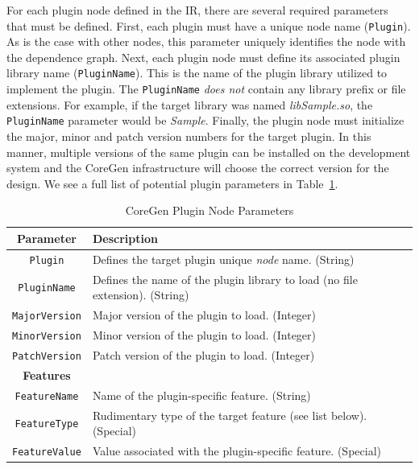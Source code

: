 \documentclass{article}
\begin{document}
For each plugin node defined in the IR, there are several required parameters that must be defined.  First, 
each plugin must have a unique node name (\texttt{Plugin}).  As is the case with other nodes, this parameter 
uniquely identifies the node with the dependence graph.  Next, each plugin node must define its associated 
plugin library name (\texttt{PluginName}).  This is the name of the plugin library utilized to implement the plugin.  
The \texttt{PluginName} \textit{does not} contain any library prefix or file extensions.  For example, if the target 
library was named \textit{libSample.so}, the \texttt{PluginName} parameter would be \textit{Sample}.  Finally, 
the plugin node must initialize the major, minor and patch version numbers for the target plugin.  In this manner, 
multiple versions of the same plugin can be installed on the development system and the CoreGen infrastructure 
will choose the correct version for the design.  We see a full list of potential plugin parameters in Table~\ref{tab:PluginParams}.    

\begin{table}[h]
\begin{center}
\caption{CoreGen Plugin Node Parameters}
\vspace{0.125in}
\label{tab:PluginParams}
\begin{tabular}{|c|l|}
\hline
\textbf{Parameter} & \textbf{Description}\\
\hline
\texttt{Plugin} & Defines the target plugin unique \textit{node} name. (String)\\
\hline
\texttt{PluginName} & Defines the name of the plugin library to load (no file extension). (String)\\
\hline
\texttt{MajorVersion} & Major version of the plugin to load. (Integer)\\
\hline
\texttt{MinorVersion} & Minor version of the plugin to load. (Integer)\\
\hline
\texttt{PatchVersion} & Patch version of the plugin to load. (Integer)\\
\hline
\textbf{Features} & \\
\hline
\texttt{FeatureName} & Name of the plugin-specific feature. (String)\\
\hline
\texttt{FeatureType} & Rudimentary type of the target feature (see list below). (Special)\\
\hline
\texttt{FeatureValue} & Value associated with the plugin-specific feature. (Special)\\
\hline
\end{tabular}
\end{center}
\end{table}
\end{document}
